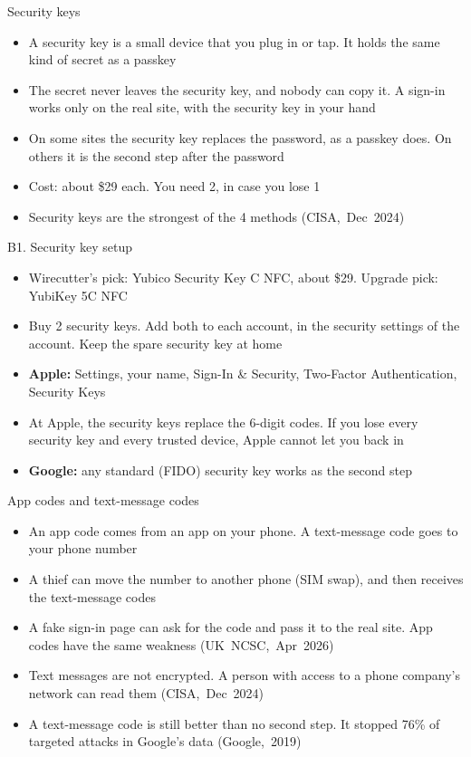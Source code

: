 \documentclass[11pt]{beamer}
\newcommand{\srccite}[1]{{\scriptsize\textcolor{citecol}{#1}}}
\newcommand{\vfy}{\unskip}
\newcommand{\vfy}{\unskip\nobreakspace{\scriptsize\textcolor{citecol}{[verify]}}}
\renewcommand{\srccite}[1]{{\scriptsize\textcolor{citecol}{\mbox{#1}}}}
\begin{document}
\begin{frame}{Security keys}
\pause
\begin{itemize}\setlength\itemsep{8pt}
\item A security key is a small device that you plug in or tap. It holds the same kind of secret as a passkey \pause
\item The secret never leaves the security key, and nobody can copy it. A sign-in works only on the real site, with the security key in your hand \pause
\item On some sites the security key replaces the password, as a passkey does. On others it is the second step after the password \pause
\item Cost: about \$29 each. You need 2, in case you lose 1 \vfy \pause
\item Security keys are the strongest of the 4 methods \srccite{(CISA, Dec 2024)} \vfy
\end{itemize}
\end{frame}


\begin{frame}{B1. Security key setup}
\pause
\begin{itemize}\setlength\itemsep{8pt}
\item Wirecutter's pick: Yubico Security Key C NFC, about \$29. Upgrade pick: YubiKey 5C NFC \vfy \pause
\item Buy 2 security keys. Add both to each account, in the security settings of the account. Keep the spare security key at home \pause
\item \textbf{Apple:} Settings, your name, Sign-In \& Security, Two-Factor Authentication, Security Keys \vfy \pause
\item At Apple, the security keys replace the 6-digit codes. If you lose every security key and every trusted device, Apple cannot let you back in \vfy \pause
\item \textbf{Google:} any standard (FIDO) security key works as the second step \vfy
\end{itemize}
\end{frame}


\begin{frame}{App codes and text-message codes}
\pause
\begin{itemize}\setlength\itemsep{9pt}
\item An app code comes from an app on your phone. A text-message code goes to your phone number \pause
\item A thief can move the number to another phone (SIM swap), and then receives the text-message codes \pause
\item A fake sign-in page can ask for the code and pass it to the real site. App codes have the same weakness \srccite{(UK NCSC, Apr 2026)} \vfy \pause
\item Text messages are not encrypted. A person with access to a phone company's network can read them \srccite{(CISA, Dec 2024)} \vfy \pause
\item[$\rightarrow$] A text-message code is still better than no second step. It stopped 76\% of targeted attacks in Google's data \srccite{(Google, 2019)} \vfy
\end{itemize}
\end{frame}
\end{document}
